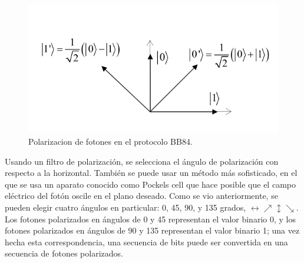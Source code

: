 \documentclass[11pt, conference]{IEEEtran}
\begin{document}
\begin{figure}[hbtp]
	\centering
	\includegraphics[scale=0.4]{1.png} 
	\caption{Polarizacion de fotones en el protocolo BB84.}
\end{figure}

Usando un filtro de polarización, se selecciona el ángulo de polarización con respecto a la horizontal. También se puede usar un método más sofisticado, en el que se usa un aparato conocido como Pockels cell que hace posible que el campo eléctrico del fotón oscile en el plano deseado. Como se vio anteriormente, se pueden elegir cuatro ángulos en particular: 0, 45, 90, y 135 grados, $\leftrightarrow \nearrow \updownarrow \searrow$. Los fotones polarizados en ángulos de 0 y 45 representan el valor binario 0, y los fotones polarizados en ángulos de 90 y 135 representan el valor binario 1; una vez hecha esta
correspondencia, una secuencia de bits puede ser convertida en una secuencia de fotones polarizados.

\pagebreak
\end{document}
